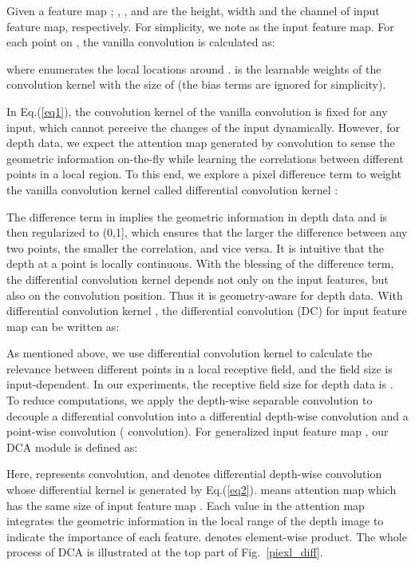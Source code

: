 \documentclass[10pt,twocolumn,letterpaper]{article}
\begin{document}
Given a feature map ; , , and  are the height, width
and the channel of input feature map, respectively. For simplicity, we note  as the input
feature map. For each point  on , the vanilla convolution is calculated as:

where  enumerates the local locations around .  is the learnable weights of the convolution kernel with the size of  (the bias terms are ignored for
simplicity).

In Eq.(\ref*{eq1}), the convolution kernel  of the vanilla convolution is fixed for any input,
which cannot perceive the changes of the input dynamically. However, for depth data, we expect the attention map generated by convolution to
sense the geometric information on-the-fly while learning the correlations between different points in a local region. To this end,
we explore a pixel difference term to weight the vanilla convolution kernel called differential convolution kernel :

The difference term in  implies the geometric information in depth data
and is then regularized to (0,1], which ensures that the larger the difference between any two points, the smaller the correlation,
and vice versa. It is intuitive that the depth at a point is locally continuous.
With the blessing of the difference term, the differential convolution kernel  depends not only on the input features,
but also on the convolution position. Thus it is geometry-aware for depth data. With differential convolution kernel , the differential convolution (DC) for input feature map
 can be written as:

As mentioned above, we use differential convolution kernel  to calculate the relevance between different points
in a local receptive field, and the field size is input-dependent. In our experiments, the receptive field size for depth data
is . To reduce computations, we apply the depth-wise separable
convolution \cite{chollet2017xception} to decouple a differential convolution into a differential depth-wise convolution and a
point-wise convolution ( convolution). For generalized input feature map ,
our DCA module is defined as:

Here,  represents  convolution, and  denotes differential depth-wise
convolution whose differential kernel is generated by Eq.(\ref*{eq2}).
 means attention map which has the same size of input feature map .
Each value in the attention map integrates the geometric information in the local range of the depth image to indicate the
importance of each feature.  denotes element-wise product. The whole process of DCA is illustrated at the top part of Fig.~\ref{piexl_diff}.
\end{document}
